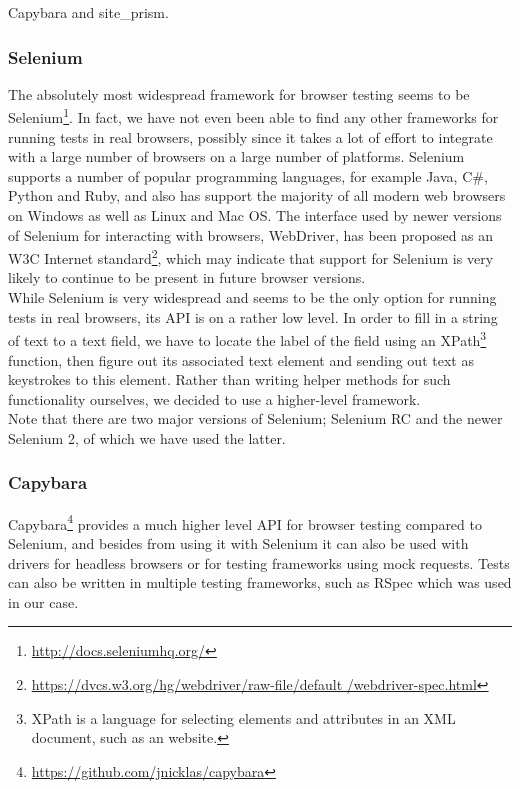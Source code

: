Capybara and site\_prism.

\subsubsection{Selenium}
The absolutely most widespread framework for browser testing seems to be
Selenium\footnote{\url{http://docs.seleniumhq.org/}}. In fact, we have
not even been able to find any other frameworks for running tests in
real browsers, possibly since it takes a lot of effort to integrate with
a large number of browsers on a large number of platforms. Selenium
supports a number of popular programming languages, for example Java,
C\#, Python and Ruby, and also has support the majority of all modern web
browsers on Windows as well as Linux and Mac OS. The interface used by
newer versions of Selenium for interacting with browsers, WebDriver, has
been proposed as an W3C Internet
standard\footnote{\url{https://dvcs.w3.org/hg/webdriver/raw-file/default
/webdriver-spec.html}}, which may indicate that support for Selenium
is very likely to continue to be present in future browser versions.
\cite{wiki:selenium}\\

While Selenium is very widespread and seems to be the only option for
running tests in real browsers, its API is on a rather low level. In
order to fill in a string of text to a text field, we have to locate the
label of the field using an XPath\footnote{XPath is a language for
selecting elements and attributes in an XML document, such as an
website.} function, then figure out its associated text element and
sending out text as keystrokes to this element. Rather than writing
helper methods for such functionality ourselves, we decided to use
a higher-level framework.\\

Note that there are two major versions of Selenium; Selenium RC
and the newer Selenium 2, of which we have used the latter.\\

\subsubsection{Capybara}
Capybara\footnote{\url{https://github.com/jnicklas/capybara}} provides a
much higher level API for browser testing compared to Selenium, and
besides from using it with Selenium it can also be used with drivers for
headless browsers or for testing frameworks using mock requests. Tests
can also be written in multiple testing frameworks, such as RSpec which
was used in our case.\\

